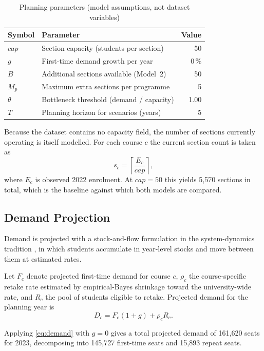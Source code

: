 \documentclass[conference]{IEEEtran}
\begin{document}
\begin{table}[htbp]
\caption{Planning parameters (model assumptions, not dataset variables)}
\label{tab:params}
\centering
\begin{tabular}{llr}
\toprule
Symbol & Parameter & Value \\
\midrule
$cap$   & Section capacity (students per section) & 50 \\
$g$     & First-time demand growth per year       & 0\,\% \\
$B$     & Additional sections available (Model~2) & 50 \\
$M_p$   & Maximum extra sections per programme    & 5 \\
$\theta$& Bottleneck threshold (demand / capacity)& 1.00 \\
$T$     & Planning horizon for scenarios (years)  & 5 \\
\bottomrule
\end{tabular}
\end{table}

Because the dataset contains no capacity field, the number of sections currently
operating is itself modelled. For each course $c$ the current section count is taken as
\begin{equation}
s_c = \left\lceil \frac{E_c}{cap} \right\rceil ,
\end{equation}
where $E_c$ is observed 2022 enrolment. At $cap = 50$ this yields 5{,}570 sections in
total, which is the baseline against which both models are compared.

\subsection{Demand Projection}

Demand is projected with a stock-and-flow formulation in the system-dynamics tradition \cite{forrester}, in which students accumulate in year-level stocks and move between them at estimated rates.

Let $F_c$ denote projected first-time demand for course $c$, $\rho_c$ the course-specific
retake rate estimated by empirical-Bayes shrinkage toward the university-wide rate, and
$R_c$ the pool of students eligible to retake. Projected demand for the planning year is
\begin{equation}
D_c = F_c (1 + g) + \rho_c R_c .
\label{eq:demand}
\end{equation}

Applying \eqref{eq:demand} with $g = 0$ gives a total projected demand of 161{,}620
seats for 2023, decomposing into 145{,}727 first-time seats and 15{,}893 repeat seats.
\end{document}
